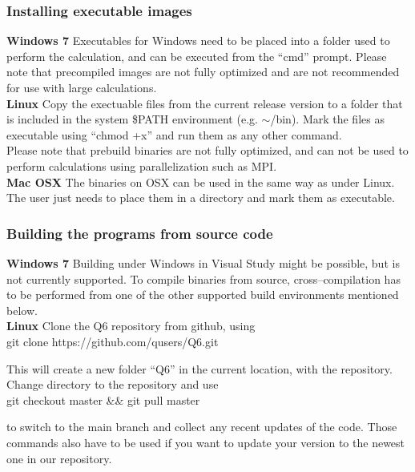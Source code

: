 \documentclass[a4paper,11pt]{article}
\newenvironment{codetext}{\fontfamily{pcr}\selectfont}{\par}
\begin{document}
\subsubsection{Installing executable images}
\textbf{Windows 7}
Executables for Windows need to be placed into a folder used to perform the calculation,
and can be executed from the ``cmd'' prompt. Please note that precompiled images are not
fully optimized and are not recommended for use with large calculations.\\

\textbf{Linux}
Copy the exectuable files from the current release version to a folder
that is included in the system {\$}PATH environment (e.g. $\sim$/bin).
Mark the files as executable using ``chmod +x'' and run them as any other command.\\
Please note that prebuild binaries are not fully optimized, and can not be used to perform
calculations using parallelization such as MPI.\\

\textbf{Mac OSX}
The binaries on OSX can be used in the same way as under Linux. The user just needs to 
place them in a directory and mark them as executable.

\subsubsection{Building the programs from source code}

\textbf{Windows 7}
Building under Windows in Visual Study might be possible, but is not currently
supported. To compile binaries from source, cross--compilation has to be performed
from one of the other supported build environments mentioned below.\\

\textbf{Linux} 
Clone the Q6 repository from github, using \\
\begin{codetext}
\noindent
git clone https://github.com/qusers/Q6.git
\end{codetext}
This will create a new folder ``Q6'' in the current location, with the repository.
Change directory to the repository and use \\
\begin{codetext}
\noindent
	git checkout master \&\& git pull master
\end{codetext}
to switch to the main branch and collect any recent updates of the code. Those commands also have to be
used if you want to update your version to the newest one in our repository.
\end{document}
